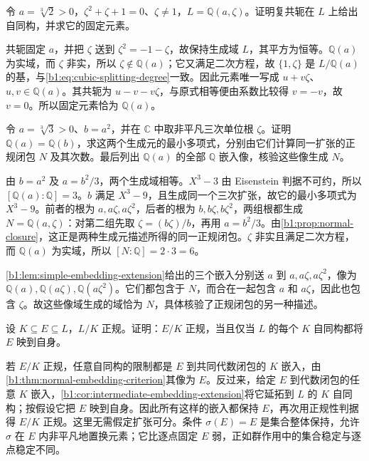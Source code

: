 \begin{exercise}\label{b1:ex:15-12}
	令 \(a=\sqrt[3]2>0\)，\(\zeta^2+\zeta+1=0\)、\(\zeta\neq1\)，\(L=\mathbb Q(a,\zeta)\)。证明复共轭在 \(L\) 上给出自同构，并求它的固定元素。
\end{exercise}
\begin{solution}
	共轭固定 \(a\)，并把 \(\zeta\) 送到 \(\zeta^2=-1-\zeta\)，故保持生成域 \(L\)，其平方为恒等。\(\mathbb Q(a)\) 为实域，而 \(\zeta\) 非实，所以 \(\zeta\notin\mathbb Q(a)\)；它又满足二次方程，故 \(\{1,\zeta\}\) 是 \(L/\mathbb Q(a)\) 的基，与\eqref{b1:eq:cubic-splitting-degree}一致。因此元素唯一写成 \(u+v\zeta\)、\(u,v\in\mathbb Q(a)\)。其共轭为 \(u-v-v\zeta\)，与原式相等便由系数比较得 \(v=-v\)，故 \(v=0\)。所以固定元素恰为 \(\mathbb Q(a)\)。
\end{solution}

\begin{exercise}\label{b1:ex:15-13}
	令 \(a=\sqrt[3]3>0\)、\(b=a^2\)，并在 \(\mathbb C\) 中取非平凡三次单位根 \(\zeta\)。证明 \(\mathbb Q(a)=\mathbb Q(b)\)，求这两个生成元的最小多项式，分别由它们计算同一扩张的正规闭包 \(N\) 及其次数。最后列出 \(\mathbb Q(a)\) 的全部 \(\mathbb Q\) 嵌入像，核验这些像生成 \(N\)。
\end{exercise}
\begin{solution}
	由 \(b=a^2\) 及 \(a=b^2/3\)，两个生成域相等。\(X^3-3\) 由 Eisenstein 判据不可约，所以 \([\mathbb Q(a):\mathbb Q]=3\)。\(b\) 满足 \(X^3-9\)，且生成同一个三次扩张，故它的最小多项式为 \(X^3-9\)。前者的根为 \(a,a\zeta,a\zeta^2\)，后者的根为 \(b,b\zeta,b\zeta^2\)，两组根都生成 \(N=\mathbb Q(a,\zeta)\)：对第二组先取 \(\zeta=(b\zeta)/b\)，再用 \(a=b^2/3\)。由\cref{b1:prop:normal-closure}，这正是两种生成元描述所得的同一正规闭包。\(\zeta\) 非实且满足二次方程，而 \(\mathbb Q(a)\) 为实域，所以 \([N:\mathbb Q]=2\cdot3=6\)。

	\cref{b1:lem:simple-embedding-extension}给出的三个嵌入分别送 \(a\) 到 \(a,a\zeta,a\zeta^2\)，像为 \(\mathbb Q(a),\mathbb Q(a\zeta),\mathbb Q(a\zeta^2)\)。它们都包含于 \(N\)，而合在一起包含 \(a\) 和 \(a\zeta\)，因此也包含 \(\zeta\)。故这些像域生成的域恰为 \(N\)，具体核验了正规闭包的另一种描述。
\end{solution}

\begin{exercise}\label{b1:ex:15-14}
	设 \(K\subseteq E\subseteq L\)，\(L/K\) 正规。证明：\(E/K\) 正规，当且仅当 \(L\) 的每个 \(K\) 自同构都将 \(E\) 映到自身。
\end{exercise}
\begin{solution}
	若 \(E/K\) 正规，任意自同构的限制都是 \(E\) 到共同代数闭包的 \(K\) 嵌入，由\cref{b1:thm:normal-embedding-criterion}其像为 \(E\)。反过来，给定 \(E\) 到代数闭包的任意 \(K\) 嵌入，\cref{b1:cor:intermediate-embedding-extension}将它延拓到 \(L\) 的 \(K\) 自同构；按假设它把 \(E\) 映到自身。因此所有这样的嵌入都保持 \(E\)，再次用正规性判据得 \(E/K\) 正规。这里无需假定扩张可分。条件 \(\sigma(E)=E\) 是集合整体保持，允许 \(\sigma\) 在 \(E\) 内非平凡地置换元素；它比逐点固定 \(E\) 弱，正如群作用中的集合稳定与逐点稳定不同。
\end{solution}
